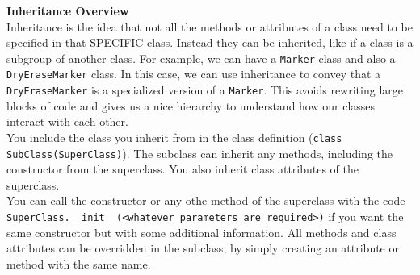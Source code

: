 \textbf{Inheritance Overview} \\
Inheritance is the idea that not all the methods or attributes of a class need to be specified in that SPECIFIC class. Instead they can be inherited, like if a class is a subgroup of another class.
For example, we can have a \lstinline{Marker} class and also a \lstinline{DryEraseMarker} class. In this case, we can use inheritance to convey that a \lstinline{DryEraseMarker} is a specialized version of a \lstinline{Marker}.
This avoids rewriting large blocks of code and gives us a nice hierarchy to understand how our classes interact with each other. \\

You include the class you inherit from in the class definition (\lstinline{class SubClass(SuperClass)}). The subclass can inherit any methods, including the constructor from the superclass. You also inherit class attributes of the superclass. \\
You can call the constructor or any othe method of the superclass with the code \lstinline{SuperClass.__init__(<whatever parameters are required>)} if you want the same constructor but with some additional information. All methods and class attributes can be overridden in the subclass, by simply creating an attribute or method with the same name. \\\\
